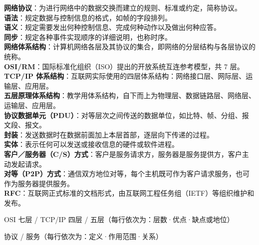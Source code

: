 \documentclass[a4paper,11pt]{article}
\begin{document}
\begin{keyterms}
\textbf{网络协议}：为进行网络中的数据交换而建立的规则、标准或约定，简称协议。\\
\textbf{语法}：规定数据与控制信息的格式，如帧的字段排列。\\
\textbf{语义}：规定需要发出何种控制信息、完成何种动作以及做出何种应答。\\
\textbf{同步}：规定各种事件实现顺序的详细说明，也称时序。\\
\textbf{网络体系结构}：计算机网络各层及其协议的集合，即网络的分层结构与各层协议的统称。\\
\textbf{OSI/RM}：国际标准化组织（ISO）提出的开放系统互连参考模型，共 7 层。\\
\textbf{TCP/IP 体系结构}：互联网实际使用的四层体系结构：网络接口层、网际层、运输层、应用层。\\
\textbf{五层原理体系结构}：教学用体系结构，自下而上为物理层、数据链路层、网络层、运输层、应用层。\\
\textbf{协议数据单元（PDU）}：对等层次之间传送的数据单位，如比特、帧、分组、报文段、报文。\\
\textbf{封装}：发送数据时在数据前面加上本层首部，逐层向下传递的过程。\\
\textbf{实体}：表示任何可以发送或接收信息的硬件或软件进程。\\
\textbf{客户／服务器（C/S）方式}：客户是服务请求方，服务器是服务提供方，客户主动发起请求。\\
\textbf{对等（P2P）方式}：通信双方地位对等，每个主机既可作为客户请求服务，也可作为服务器提供服务。\\
\textbf{RFC}：互联网正式标准的文档形式，由互联网工程任务组（IETF）等组织维护和发布。
\end{keyterms}

\begin{contrast}{OSI 七层 / TCP/IP 四层 / 五层（每行依次为：层数·优点·缺点或地位）}
\end{contrast}

\begin{contrast}{协议 / 服务（每行依次为：定义·作用范围·关系）}
\end{contrast}
\end{document}
